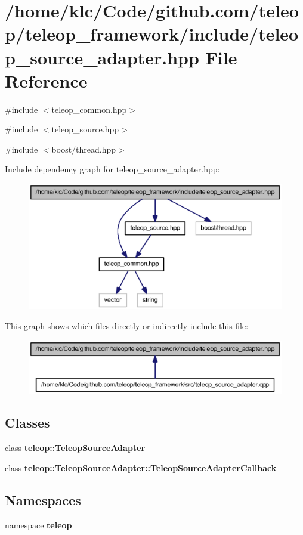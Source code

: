 \section{/home/klc/Code/github.com/teleop/teleop\_\-framework/include/teleop\_\-source\_\-adapter.hpp File Reference}
\label{teleop__source__adapter_8hpp}
{\ttfamily \#include $<$teleop\_\-common.hpp$>$}\par
{\ttfamily \#include $<$teleop\_\-source.hpp$>$}\par
{\ttfamily \#include $<$boost/thread.hpp$>$}\par
Include dependency graph for teleop\_\-source\_\-adapter.hpp:
\nopagebreak
\begin{figure}[H]
\begin{center}
\leavevmode
\includegraphics[width=400pt]{teleop__source__adapter_8hpp__incl}
\end{center}
\end{figure}
This graph shows which files directly or indirectly include this file:
\nopagebreak
\begin{figure}[H]
\begin{center}
\leavevmode
\includegraphics[width=400pt]{teleop__source__adapter_8hpp__dep__incl}
\end{center}
\end{figure}
\subsection*{Classes}
\begin{DoxyCompactItemize}
\item 
class {\bf teleop::TeleopSourceAdapter}
\item 
class {\bf teleop::TeleopSourceAdapter::TeleopSourceAdapterCallback}
\end{DoxyCompactItemize}
\subsection*{Namespaces}
\begin{DoxyCompactItemize}
\item 
namespace {\bf teleop}
\end{DoxyCompactItemize}
